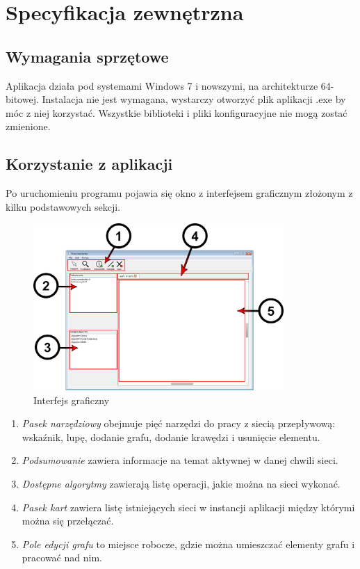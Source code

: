 \chapter{Specyfikacja zewnętrzna}
\section{Wymagania sprzętowe}
Aplikacja działa pod systemami Windows 7 i nowszymi, na architekturze 64-bitowej. Instalacja nie jest wymagana, wystarczy otworzyć plik aplikacji .exe by móc z niej korzystać. Wszystkie biblioteki i pliki konfiguracyjne nie mogą zostać zmienione.
\section{Korzystanie z aplikacji}
Po uruchomieniu programu pojawia się okno z interfejsem graficznym złożonym z kilku podstawowych sekcji.
\begin{figure}[H]
	\centering
	\includegraphics[width=0.85\textwidth]{./img/spec_zew01-1.png}
	\caption{Interfejs graficzny}
\end{figure}
\begin{enumerate}
	\item \textit{Pasek narzędziowy} obejmuje pięć narzędzi do pracy z siecią przepływową: wskaźnik, lupę, dodanie grafu, dodanie krawędzi i usunięcie elementu.
	\item \textit{Podsumowanie} zawiera informacje na temat aktywnej w danej chwili sieci.
	\item \textit{Dostępne algorytmy} zawierają listę operacji, jakie można na sieci wykonać.
	\item \textit{Pasek kart} zawiera listę istniejących sieci w instancji aplikacji między którymi można się przełączać.
	\item \textit{Pole edycji grafu} to miejsce robocze, gdzie można umieszczać elementy grafu i pracować nad nim.
\end{enumerate}
